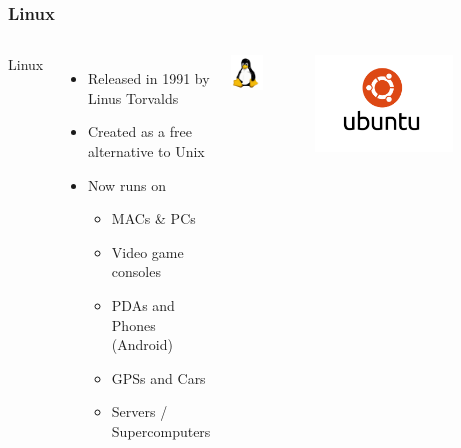 \documentclass{beamer}
\begin{document}
\begin{frame}
  \frametitle{Linux}
  \begin{columns}
    \begin{LARGE}
      Linux
    \end{LARGE}
    \begin{itemize}
    \item Released in 1991 by Linus Torvalds
    \item Created as a free alternative to Unix
    \item Now runs on
      \begin{itemize}
      \item MACs \& PCs
      \item Video game consoles
      \item PDAs and Phones (Android)
      \item GPSs and Cars
      \item Servers / Supercomputers
      \end{itemize}
    \end{itemize}
      \begin{center}\includegraphics[width=0.5\textwidth]{../img/tux}\end{center}
      
      \begin{center}\includegraphics[width=0.7\textwidth]{../img/ubuntu-stacked}\end{center}
  \end{columns}
\end{frame}
\end{document}
